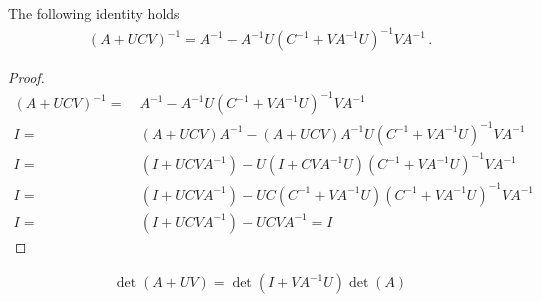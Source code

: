 \begin{proposition}
    The following identity holds
    \begin{align}
        \left(A + UCV\right)^{-1} = A^{-1} - A^{-1}U\left(C^{-1} + VA^{-1}U\right)^{-1}VA^{-1}\,.
    \end{align}
\end{proposition}
\begin{proof}
    \begin{align}
        \left(A + UCV\right)^{-1} =~& A^{-1} - A^{-1}U\left(C^{-1} + VA^{-1}U\right)^{-1}VA^{-1}\\
        I =~& \left(A + UCV\right)A^{-1} - \left(A + UCV\right)A^{-1}U\left(C^{-1} + VA^{-1}U\right)^{-1}VA^{-1}\\
        I =~& \left(I + UCVA^{-1}\right) - U\left(I + CVA^{-1}U\right)\left(C^{-1} + VA^{-1}U\right)^{-1}VA^{-1}\\
        I =~& \left(I + UCVA^{-1}\right) - UC\left(C^{-1} + VA^{-1}U\right)\left(C^{-1} + VA^{-1}U\right)^{-1}VA^{-1}\\
        I =~& \left(I + UCVA^{-1}\right) - UCVA^{-1} = I
    \end{align}
\end{proof}

\begin{proposition}
    \begin{align}
        \det(A + UV) = \det(I + VA^{-1}U)\det(A)
    \end{align}
\end{proposition}

